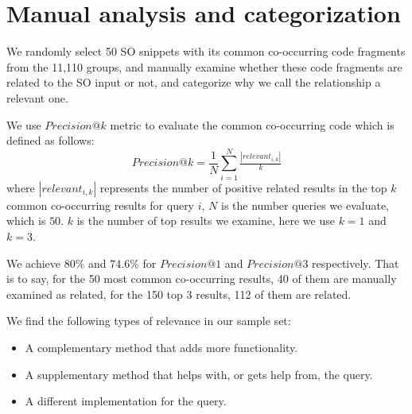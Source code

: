 %
%
%
%

\section{Manual analysis and categorization}
\label{sec:eval}

We randomly select 50 SO snippets with its common co-occurring code fragments from the 11,110 groups, and manually examine whether these code fragments are related to the SO input or not, and categorize why we call the relationship a relevant one.

We use $Precision@k$ metric to evaluate the common co-occurring code  which is defined as follows:
\begin{equation}
Precision@k = \frac{1}{N}\sum_{i=1}^{N}\tfrac{\left | relevant_{i,k} \right |}{k}
\end{equation}
where $\left | relevant_{i,k} \right |$ represents the number of positive related results in the top $k$ common co-occurring results for query $i$, $N$ is the number queries we evaluate, which is $50$. $k$ is the number of top results we examine, here we use $k=1$ and $k=3$.

We achieve 80\% and 74.6\% for $Precision@1$ and $Precision@3$ respectively. That is to say, for the 50 most common co-occurring results, 40 of them are manually examined as related, for the 150 top 3 results, 112 of them are related.

We find the following types of relevance in our sample set:
\begin{itemize}
	\item A complementary method that adds more functionality.
	\item A supplementary method that helps with, or gets help from, the query. 
	\item A different implementation for the query.	
\end{itemize}


